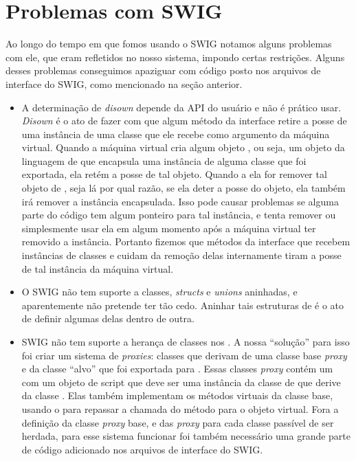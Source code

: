   
  \section{Problemas com SWIG}
  Ao longo do tempo em que fomos usando o SWIG notamos alguns problemas com ele, que eram
  refletidos no nosso sistema, impondo certas restrições. Alguns desses problemas conseguimos
  apaziguar com código posto nos arquivos de interface do SWIG, como mencionado na seção
  anterior.
  
  \begin{itemize}
    \item A determinação de \textit{disown} depende da API do usuário e não é prático usar.
      \textit{Disown} é o ato de fazer com que algum método da interface \CXX{} retire a posse
      de uma instância de uma classe \CXX{} que ele recebe como argumento da máquina virtual. 
      Quando a máquina virtual cria algum objeto \CXX{}, ou seja, um objeto da linguagem de 
      \script{} que encapsula uma instância de alguma classe \CXX{} que foi exportada, ela
      retém a posse de tal objeto. Quando a ela for remover tal objeto de \script{}, seja 
      lá por qual razão, se ela deter a posse do objeto, ela também irá remover a instância 
      \CXX{} encapsulada. Isso pode causar problemas se alguma parte do código \CXX{} tem 
      algum ponteiro para tal instância, e tenta remover ou simplesmente usar ela em algum
      momento após a máquina virtual ter removido a instância. Portanto fizemos que métodos
      da interface \CXX{} que recebem instâncias de classes e cuidam da remoção delas 
      internamente tiram a posse de tal instância da máquina virtual.
    \item O SWIG não tem suporte a classes, \textit{structs} e \textit{unions} aninhadas, e 
      aparentemente não pretende ter tão cedo. Aninhar tais estruturas de \CXX{} é o ato
      de definir algumas delas dentro de outra.
    \item SWIG não tem suporte a herança de classes \CXX{} nos . A nossa ``solução''
      para isso foi criar um sistema de \textit{proxies}\footnotemark: classes \CXX{} que derivam de uma
      classe base \textit{proxy} e da classe ``alvo'' \CXX{} que foi exportada para \script{}.
      Essas classes \textit{proxy} contém um \VObj{} com um objeto de script que deve ser uma
      instância da classe de \script{} que derive da classe \CXX{}. Elas também implementam 
      os métodos virtuais da classe base, usando o \VObj{} para repassar a chamada do método
      para o objeto virtual. Fora a definição da classe \textit{proxy} base, e das \textit{proxy}
      para cada classe \CXX{} passível de ser herdada, para esse sistema funcionar foi também
      necessário uma grande parte de código adicionado nos arquivos de interface do SWIG.
      

\end{itemize}
